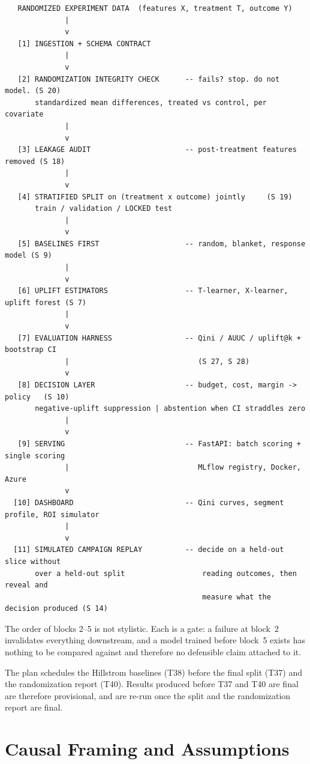 \documentclass[11pt,a4paper]{article}
\begin{document}
{\footnotesize
\begin{verbatim}
   RANDOMIZED EXPERIMENT DATA  (features X, treatment T, outcome Y)
              |
              v
   [1] INGESTION + SCHEMA CONTRACT
              |
              v
   [2] RANDOMIZATION INTEGRITY CHECK      -- fails? stop. do not model. (S 20)
       standardized mean differences, treated vs control, per covariate
              |
              v
   [3] LEAKAGE AUDIT                      -- post-treatment features removed (S 18)
              |
              v
   [4] STRATIFIED SPLIT on (treatment x outcome) jointly     (S 19)
       train / validation / LOCKED test
              |
              v
   [5] BASELINES FIRST                    -- random, blanket, response model (S 9)
              |
              v
   [6] UPLIFT ESTIMATORS                  -- T-learner, X-learner, uplift forest (S 7)
              |
              v
   [7] EVALUATION HARNESS                 -- Qini / AUUC / uplift@k + bootstrap CI
              |                              (S 27, S 28)
              v
   [8] DECISION LAYER                     -- budget, cost, margin -> policy   (S 10)
       negative-uplift suppression | abstention when CI straddles zero
              |
              v
   [9] SERVING                            -- FastAPI: batch scoring + single scoring
              |                              MLflow registry, Docker, Azure
              v
  [10] DASHBOARD                          -- Qini curves, segment profile, ROI simulator
              |
              v
  [11] SIMULATED CAMPAIGN REPLAY          -- decide on a held-out slice without
       over a held-out split                  reading outcomes, then reveal and
                                              measure what the decision produced (S 14)
\end{verbatim}}

The order of blocks 2--5 is not stylistic. Each is a gate: a failure at block~2 invalidates
everything downstream, and a model trained before block~5 exists has nothing to be compared
against and therefore no defensible claim attached to it.

The plan schedules the Hillstrom baselines (T38) before the final split (T37) and the
randomization report (T40). Results produced before T37 and T40 are final are therefore
provisional, and are re-run once the split and the randomization report are final.

\section{Causal Framing and Assumptions}
\label{sec:assumptions}
\end{document}
